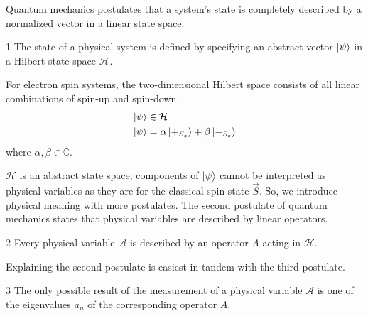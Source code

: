 Quantum mechanics postulates that a system's state is completely described by a normalized vector in a linear state space.
\begin{Thm:Postulate}{1}
    The state of a physical system is defined by specifying an abstract vector $\ket{\psi}$ in a Hilbert state space $\mathcal{H}$.
\end{Thm:Postulate}

For electron spin systems, the two-dimensional Hilbert space consists of all linear combinations of spin-up and spin-down,
\begin{align}
  \ket{\psi} &\in \mathcal{H} \\ \nonumber
  \ket{\psi} &= \alpha\ket{+_{S_z}} + \beta\ket{-_{S_z}}
\end{align}
where $\alpha, \beta \in \mathbb{C}$.

$\mathcal{H}$ is an abstract state space; components of $\ket{\psi}$ cannot be interpreted as physical variables as they are for the classical spin state $\vec{S}$. So, we introduce physical meaning with more postulates.
The second postulate of quantum mechanics states that physical variables are described by linear operators.
\begin{Thm:Postulate}{2}
    Every physical variable $\mathcal{A}$ is described by an operator $A$ acting in $\mathcal{H}$.
\end{Thm:Postulate}
Explaining the second postulate is easiest in tandem with the third postulate.
\begin{Thm:Postulate}{3}
    The only possible result of the measurement of a physical variable $\mathcal{A}$ is one of the eigenvalues $a_n$ of the corresponding operator $A$.
\end{Thm:Postulate}

